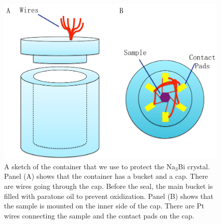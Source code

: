 \begin{figure}[!htbp]
  \begin{center}
\includegraphics[width=0.8\linewidth]{ch-expsetup/figures/Na3Bi_container.pdf}
\caption{\label{Na3Bi_container}
A sketch of the container that we use to protect the Na$_3$Bi crystal. Panel (A) shows that the container has a bucket and a cap. There are wires  going through the cap. Before the seal, the main bucket is filled with paratone oil to prevent oxidization. Panel (B) shows that the sample is mounted on the inner side of the cap. There are Pt wires connecting the sample and the contact pads on the cap. 
}
  \end{center}
\end{figure}





